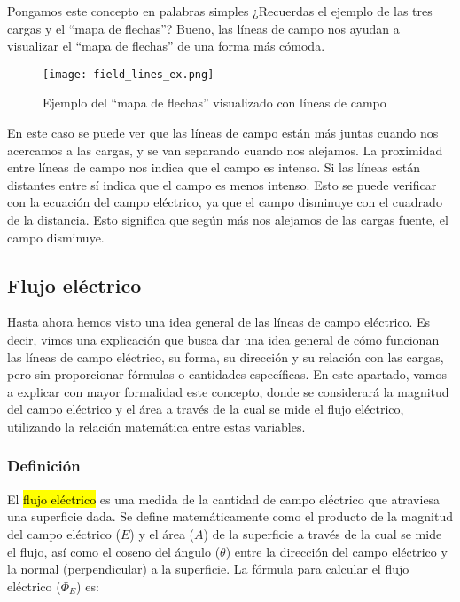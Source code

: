 Pongamos este concepto en palabras simples ¿Recuerdas el ejemplo de las tres cargas y el ``mapa de flechas''? Bueno, las líneas de campo nos ayudan a visualizar el ``mapa de flechas'' de una forma más cómoda.

\begin{figure}[ht]
    \centering
    \texttt{[image: field\_lines\_ex.png]}
    \caption{Ejemplo del ``mapa de flechas'' visualizado con líneas de campo}
    \label{fig:ej_lineas_de_campo}
\end{figure}

En este caso se puede ver que las líneas de campo están más juntas cuando nos acercamos a las cargas, y se van separando cuando nos alejamos. La proximidad entre líneas de campo nos indica que el campo es intenso. Si las líneas están distantes entre sí indica que el campo es menos intenso. Esto se puede verificar con la ecuación del campo eléctrico, ya que el campo disminuye con el cuadrado de la distancia. Esto significa que según más nos alejamos de las cargas fuente, el campo disminuye.

\subsection{Flujo eléctrico}

Hasta ahora hemos visto una idea general de las líneas de campo eléctrico. Es decir, vimos una explicación que busca dar una idea general de cómo funcionan las líneas de campo eléctrico, su forma, su dirección y su relación con las cargas, pero sin proporcionar fórmulas o cantidades específicas. En este apartado, vamos a explicar con mayor formalidad este concepto, donde se considerará la magnitud del campo eléctrico y el área a través de la cual se mide el flujo eléctrico, utilizando la relación matemática entre estas variables.

\subsubsection{Definición}

El \hl{flujo eléctrico} es una medida de la cantidad de campo eléctrico que atraviesa una superficie dada. Se define matemáticamente como el producto de la magnitud del campo eléctrico (\(E\)) y el área (\(A\)) de la superficie a través de la cual se mide el flujo, así como el coseno del ángulo (\(\theta\)) entre la dirección del campo eléctrico y la normal (perpendicular) a la superficie. La fórmula para calcular el flujo eléctrico (\(\Phi_E\)) es:

